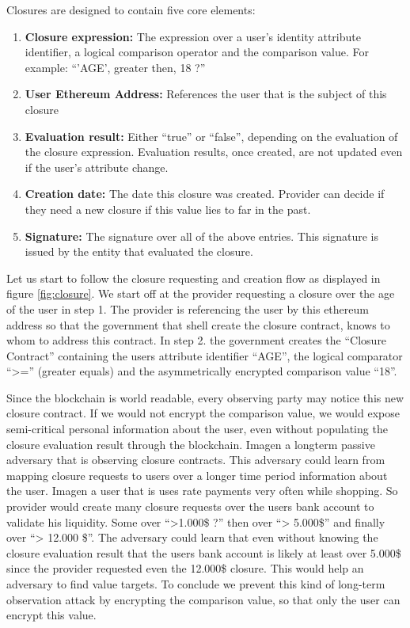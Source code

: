 \noindent Closures are designed to contain five core elements:
\begin{enumerate}
\item \textbf{Closure expression:} The expression over a user’s identity attribute identifier, a logical  comparison operator and the comparison value. For example: “’AGE’, greater then, 18 ?”
\item \textbf{User Ethereum Address:} References the user that is the subject of this closure
\item \textbf{Evaluation result:} Either “true” or “false”, depending on the evaluation of the closure expression. Evaluation results, once created, are not updated even if the user’s attribute change.
\item \textbf{Creation date:} The date this closure was created. Provider can decide if they need a new closure if this value lies to far in the past. 
\item \textbf{Signature:} The signature over all of the above entries. This signature is issued by the entity that evaluated the closure.
\end{enumerate}

Let us start to follow the closure requesting and creation flow as displayed in figure \ref{fig:closure}. We start off at the provider requesting a closure over the age of the user in step 1. 
The provider is referencing the user by this ethereum address so that the government that shell create the closure contract, knows to whom to address this contract. In step 2. the government creates the “Closure Contract” containing the users attribute identifier “AGE”, the logical comparator “>=” (greater equals) and the asymmetrically encrypted comparison value “18”.  

Since the blockchain is world readable, every observing party may notice this new closure contract. If we would not encrypt the comparison value, we would expose semi-critical personal information about the user, even without populating the closure evaluation result through the blockchain. Imagen a longterm passive adversary that is observing closure contracts. This adversary could learn from mapping closure requests to users over a longer time period information about the user. Imagen a user that is uses rate payments very often while shopping. So provider would create many closure requests over the users bank account to validate his liquidity. Some over “>1.000\$ ?” then over “> 5.000\$” and finally over “> 12.000 \$”. The adversary could learn that even without knowing the closure evaluation result that the users bank account is likely at least over 5.000\$ since the provider requested even the 12.000\$ closure. This would help an adversary to find value targets. 
To conclude we prevent this kind of long-term observation attack by encrypting the comparison value, so that only the user can encrypt this value. 

